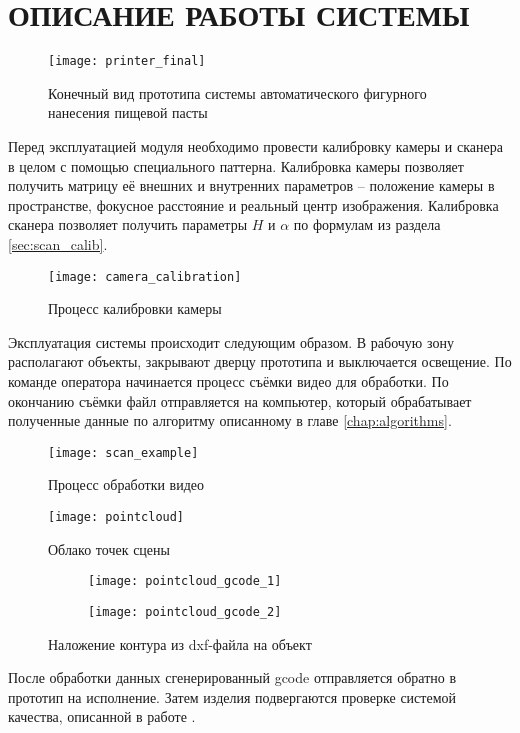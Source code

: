 \chapter{ОПИСАНИЕ РАБОТЫ СИСТЕМЫ}
    \begin{figure}[H]
        \centering
        \texttt{[image: printer\_final]}\\
        \caption{Конечный вид прототипа системы автоматического фигурного нанесения пищевой пасты}
    \end{figure}

    Перед эксплуатацией модуля необходимо провести калибровку камеры и сканера в целом с помощью специального паттерна. Калибровка камеры позволяет получить матрицу её внешних и внутренних параметров -- положение камеры в пространстве, фокусное расстояние и реальный центр изображения.
    Калибровка сканера позволяет получить параметры $ H $ и $ \alpha $ по формулам из раздела \ref{sec:scan_calib}. 
    
    \begin{figure}[H]
        \centering
        \texttt{[image: camera\_calibration]}
        \caption{Процесс калибровки камеры}
    \end{figure}
    
    Эксплуатация системы происходит следующим образом. В рабочую зону располагают объекты, закрывают дверцу прототипа и выключается освещение. По команде оператора начинается процесс съёмки видео для обработки. По окончанию съёмки файл отправляется на компьютер, который обрабатывает полученные данные по алгоритму описанному в главе \ref{chap:algorithms}.
    
    \begin{figure}[H]
        \centering
        \texttt{[image: scan\_example]}
        \caption{Процесс обработки видео}
    \end{figure}
    \begin{figure}[H]
        \centering
        \texttt{[image: pointcloud]}
        \caption{Облако точек сцены}
    \end{figure}
    \begin{figure}[H]
        \begin{subfigure}{0.5\linewidth}
            \texttt{[image: pointcloud\_gcode\_1]}
        \end{subfigure}
        \begin{subfigure}{0.5\linewidth}
            \texttt{[image: pointcloud\_gcode\_2]}
        \end{subfigure}
        \caption{Наложение контура из dxf-файла на объект}
    \end{figure}
    
    После обработки данных сгенерированный gcode отправляется обратно в прототип на исполнение. Затем изделия подвергаются проверке системой качества, описанной в работе \cite{mayor}.
